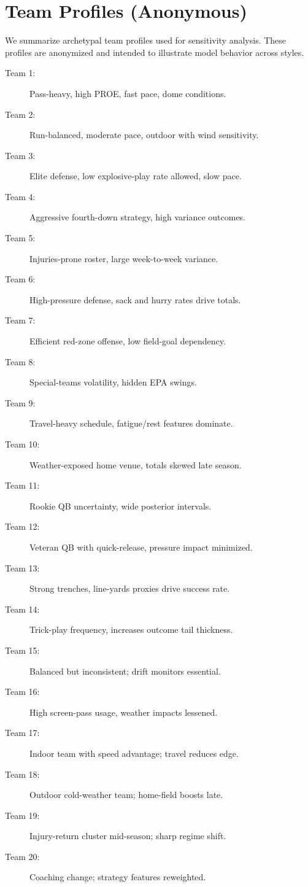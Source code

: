 \section{Team Profiles (Anonymous)}\label{app:team-profiles-anon}
We summarize archetypal team profiles used for sensitivity analysis. These profiles are anonymized and intended to illustrate model behavior across styles.
\begin{description}
  \item[Team 1:] Pass-heavy, high PROE, fast pace, dome conditions.
  \item[Team 2:] Run-balanced, moderate pace, outdoor with wind sensitivity.
  \item[Team 3:] Elite defense, low explosive-play rate allowed, slow pace.
  \item[Team 4:] Aggressive fourth-down strategy, high variance outcomes.
  \item[Team 5:] Injuries-prone roster, large week-to-week variance.
  \item[Team 6:] High-pressure defense, sack and hurry rates drive totals.
  \item[Team 7:] Efficient red-zone offense, low field-goal dependency.
  \item[Team 8:] Special-teams volatility, hidden EPA swings.
  \item[Team 9:] Travel-heavy schedule, fatigue/rest features dominate.
  \item[Team 10:] Weather-exposed home venue, totals skewed late season.
  \item[Team 11:] Rookie QB uncertainty, wide posterior intervals.
  \item[Team 12:] Veteran QB with quick-release, pressure impact minimized.
  \item[Team 13:] Strong trenches, line-yards proxies drive success rate.
  \item[Team 14:] Trick-play frequency, increases outcome tail thickness.
  \item[Team 15:] Balanced but inconsistent; drift monitors essential.
  \item[Team 16:] High screen-pass usage, weather impacts lessened.
  \item[Team 17:] Indoor team with speed advantage; travel reduces edge.
  \item[Team 18:] Outdoor cold-weather team; home-field boosts late.
  \item[Team 19:] Injury-return cluster mid-season; sharp regime shift.
  \item[Team 20:] Coaching change; strategy features reweighted.

\end{description}
